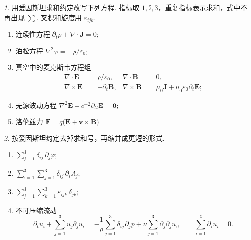 \documentclass[11pt]{article}
\theoremstyle{remark}
\newtheorem{problem}{}
\begin{document}
\renewcommand{\labelenumi}{(\arabic{enumi})}
\renewcommand{\labelenumii}{(\arabic{enumi}.\arabic{enumii})}


\begin{problem}
  用爱因斯坦求和约定改写下列方程. 指标取 $1,2,3$，重复指标表示求和，式中不再出现 $\sum$. 叉积和旋度用 $\varepsilon_{ijk}$.
  \begin{enumerate}
    \item 连续性方程 $\partial_t\rho+\nabla\cdot\mathbf{J}=0$;
    \item 泊松方程 $\nabla^2\varphi=-\rho/\varepsilon_0$;
    \item 真空中的麦克斯韦方程组
      \[
        \begin{aligned}
          \nabla\cdot\mathbf{E}&=\rho/\varepsilon_0, &
          \nabla\cdot\mathbf{B}&=0,\\
          \nabla\times\mathbf{E}&=-\partial_t\mathbf{B}, &
          \nabla\times\mathbf{B}
          &=\mu_0\mathbf{J}+\mu_0\varepsilon_0\partial_t\mathbf{E};
        \end{aligned}
      \]
    \item 无源波动方程
      $\nabla^2\mathbf{E}-c^{-2}\partial_{tt}\mathbf{E}=\mathbf{0}$;
    \item 洛伦兹力
      $\mathbf{F}=q\bigl(\mathbf{E}+\mathbf{v}\times\mathbf{B}\bigr)$.
  \end{enumerate}
\end{problem}

\vspace{1.6em}

\begin{problem}
  按爱因斯坦约定去掉求和号，再缩并成更短的形式.
  \begin{enumerate}
    \item $\displaystyle\sum_{j=1}^{3}\delta_{ij}\,\partial_j\varphi$;
    \item $\displaystyle\sum_{i=1}^{3}\sum_{j=1}^{3}\delta_{ij}\,\partial_i A_j$;
    \item $\displaystyle\sum_{j=1}^{3}\sum_{k=1}^{3}\varepsilon_{ijk}\,\delta_{jk}$;
    \item 不可压缩流动
      \[
        \partial_t u_i
        +\sum_{j=1}^{3}u_j\partial_j u_i
        =-\frac{1}{\rho}\sum_{j=1}^{3}\delta_{ij}\,\partial_j p
         +\nu\sum_{j=1}^{3}\partial_j\partial_j u_i,
        \qquad
        \sum_{i=1}^{3}\partial_i u_i=0.
      \]
  \end{enumerate}
\end{problem}
  
\end{document}
